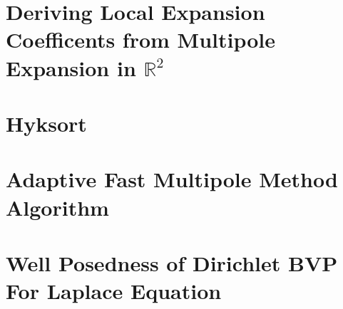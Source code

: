 
\chapter{Deriving Local Expansion Coefficents from Multipole Expansion in $\mathbb{R}^2$}\label{app:locals}


\chapter{Hyksort}\label{app:hyksort}


\chapter{Adaptive Fast Multipole Method Algorithm}\label{app:adaptive_fmm}


\chapter{Well Posedness of Dirichlet BVP For Laplace Equation}\label{app:laplace_bvp}
